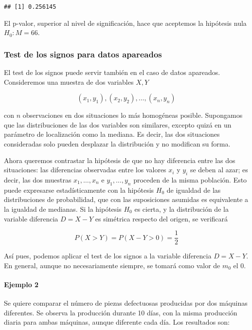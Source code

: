 \documentclass[
]{article}
\begin{document}
\begin{verbatim}
## [1] 0.256145
\end{verbatim}

El p-valor, superior al nivel de significación, hace que aceptemos la hipótesis nula \(H_{0}: M=66\).

\subsubsection{Test de los signos para datos apareados}\label{test-de-los-signos-para-datos-apareados}

El test de los signos puede servir también en el caso de datos apareados.
Consideremos una muestra de dos variables \(X, Y\)

\[
\left(x_{1}, y_{1}\right),\left(x_{2}, y_{2}\right), \ldots,\left(x_{n}, y_{n}\right)
\]

con \(n\) observaciones en dos situaciones lo más homogéneas posible.
Supongamos que las distribuciones de las dos variables son similares, excepto quizá en un parámetro de localización como la mediana. Es decir, las dos situaciones consideradas solo pueden desplazar la distribución y no modifican su forma.

Ahora queremos contrastar la hipótesis de que no hay diferencia entre las dos situaciones: las diferencias observadas entre los valores \(x_{i}\) y \(y_{i}\) se deben al azar; es decir, las dos muestras \(x_{1}, \ldots, x_{n}\) e \(y_{1}, \ldots, y_{n}\) proceden de la misma población. Esto puede expresarse estadísticamente con la hipótesis \(H_{0}\) de igualdad de las distribuciones de probabilidad, que con las suposiciones asumidas es equivalente a la igualdad de medianas.
Si la hipótesis \(H_{0}\) es cierta, y la distribución de la variable diferencia \(D=X-Y\) es simétrica respecto del origen, se verificará

\[
P(X>Y)=P(X-Y>0)=\frac{1}{2}
\]

Así pues, podemos aplicar el test de los signos a la variable diferencia \(D=X-Y\). En general, aunque no necesariamente siempre, se tomará como valor de \(m_{0}\) el 0.

\paragraph{Ejemplo 2}\label{ejemplo-2-1}

Se quiere comparar el número de piezas defectuosas producidas por dos máquinas diferentes. Se observa la producción durante 10 días, con la misma producción diaria para ambas máquinas, aunque diferente cada día. Los resultados son:
\end{document}
